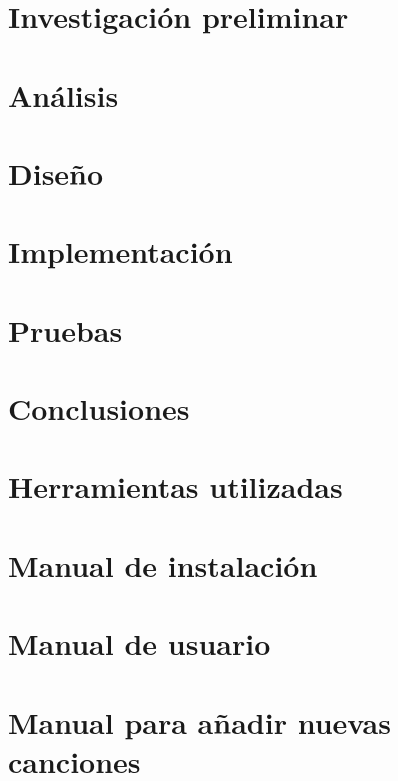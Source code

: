\documentclass[a4paper,12pt]{scrbook}
\begin{document}
\chapter{Investigación preliminar}


\chapter{Análisis}


\chapter{Diseño}


\chapter{Implementación}


\chapter{Pruebas}


\chapter{Conclusiones}


\appendix

\chapter{Herramientas utilizadas}


\chapter{Manual de instalación}
\label{sec:maninstalacion}


\chapter{Manual de usuario}


\chapter{Manual para añadir nuevas canciones}
\label{chap:manual_canciones}

\end{document}
